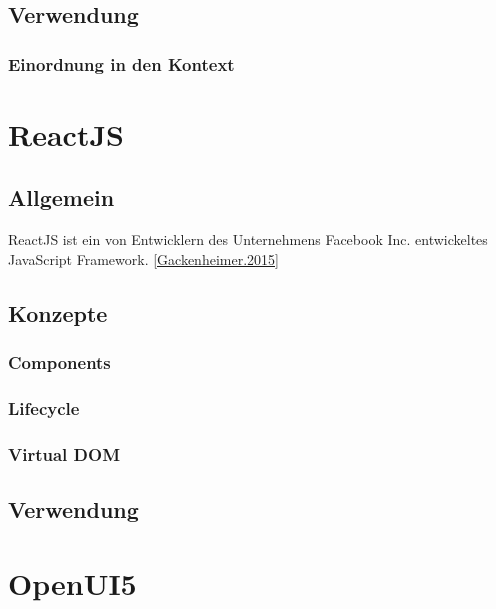 \subsection{Verwendung}

\subsubsection{Einordnung in den Kontext}


\section{ReactJS}

\subsection{Allgemein}


ReactJS ist ein von Entwicklern des Unternehmens Facebook Inc. entwickeltes JavaScript Framework. \autoref{Gackenheimer.2015} 


%



\subsection{Konzepte}

\subsubsection{Components}



\subsubsection{Lifecycle}

\subsubsection{Virtual DOM}

\subsection{Verwendung}




\section{OpenUI5}